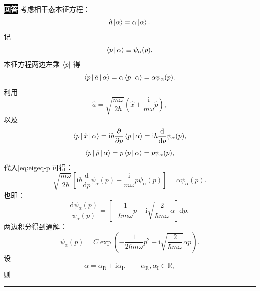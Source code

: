 \documentclass[11pt,a4paper]{ctexart}
\newenvironment{answer}
  {\par\smallskip\noindent
   \begingroup
   \setlength{\fboxsep}{4pt}%
   \colorbox{black}{\textcolor{white}{\bfseries 回答}}%
   \endgroup
   \quad\ignorespaces}
  {\par\smallskip\noindent\rule{\linewidth}{0.4pt}\medskip}
\begin{document}
\begin{answer}
  考虑相干态本征方程：
  \begin{equation}
    \hat{a} \Ket{\alpha } = \alpha \Ket{\alpha }.
  \end{equation}
  记
  \begin{equation}
    \Braket{p|\alpha } \equiv \psi_\alpha(p),
  \end{equation}
  本征方程两边左乘 $\Bra{p } $ 得
  \begin{equation}
    \Braket{p|\hat{a}|\alpha } = \alpha\Braket{p|\alpha } = \alpha \psi_\alpha(p).
    \label{eq:eigeq-p}
  \end{equation}
  利用
  \begin{equation}
    \hat{a}
    =\sqrt{\frac{m\omega }{2\hbar } } \left(\hat{x} + \frac{\mathrm{i} }{m\omega }\hat{p}  \right),
  \end{equation}
  以及
  \begin{equation}
    \Braket{p|\hat{x}|\alpha }
    =\mathrm{i} \hbar \frac{\partial }{\partial p } \Braket{p|\alpha } 
    =\mathrm{i} \hbar \frac{\mathrm{d}}{\mathrm{d} p } \psi_\alpha(p),
  \end{equation}
  \begin{equation}
    \Braket{p|\hat{p}|\alpha }
    =p\Braket{p|\alpha }
    =p\psi_\alpha(p),
  \end{equation}
  代入\eqref{eq:eigeq-p}可得：
  \begin{equation}
    \sqrt{\frac{m\omega }{2\hbar } } \left[\mathrm{i}\hbar \frac{\mathrm{d} }{\mathrm{d}p } \psi_\alpha(p) + \frac{\mathrm{i} }{m\omega } p \psi_\alpha(p) \right]
    =\alpha \psi_\alpha(p).
  \end{equation}
  也即：
  \begin{equation}
    \frac{\mathrm{d}\psi_\alpha(p) }{\psi_\alpha(p) }
    =\left[-\frac{1 }{\hbar m\omega }p-\mathrm{i} \sqrt{\frac{2 }{\hbar m\omega } }\alpha  \right]\mathrm{d}p, 
  \end{equation}
  两边积分得到通解：
  \begin{equation}
    \psi_\alpha(p)
    =C \exp\left(-\frac{1 }{2\hbar m\omega }p^2 - \mathrm{i} \sqrt{\frac{2 }{\hbar m\omega } }\alpha p \right).
  \end{equation}
  设
  \begin{equation}
    \alpha = \alpha_{\mathrm{R}} + \mathrm{i}\alpha_{\mathrm{I}},\qquad \alpha_{\mathrm{R}},\alpha_{\mathrm{I}}\in\mathbb{R},
  \end{equation}
  则
  \begin{equation}

\end{equation}
\end{answer}
\end{document}
